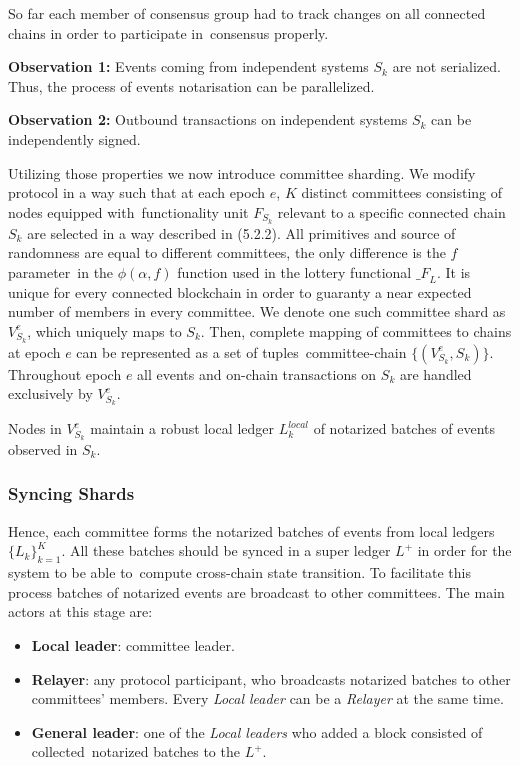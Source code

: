 So far each member of consensus group had to track changes on all connected chains in order to participate in\
consensus properly.

\textbf{Observation 1:} Events coming from independent systems $S_k$ are not serialized.
Thus, the process of events notarisation can be parallelized.

\textbf{Observation 2:} Outbound transactions on independent systems $S_k$ can be independently signed.

Utilizing those properties we now introduce committee sharding.
We modify protocol in a way such that at each epoch $e$, $K$ distinct committees consisting of nodes equipped with\
functionality unit $F_{S_k}$ relevant to a specific connected chain $S_k$ are selected in a way described in (5.2.2).
All primitives and source of randomness are equal to different committees, the only difference is the $f$ parameter\
in the $\phi(\alpha, f)$ function used in the lottery functional ${\mathcal_{F}}_{L}$.
It is unique for every connected blockchain in order to guaranty a near expected number of members in every committee.
We denote one such committee shard as $V^{e}_{S_k}$, which uniquely maps to $S_k$.
Then, complete mapping of committees to chains at epoch $e$ can be represented as a set of tuples\
committee-chain $\{(V^{e}_{S_k}, S_k)\}$.
Throughout epoch $e$ all events and on-chain transactions on $S_k$ are handled exclusively by $V^{e}_{S_k}$.

Nodes in $V^{e}_{S_k}$ maintain a robust local ledger $L^{local}_k$ of notarized batches of events observed in $S_k$.

\subsubsection{Syncing Shards}

Hence, each committee forms the notarized batches of events from local ledgers $\{L_k\}_{k=1}^{K}$.
All these batches should be synced in a super ledger $L^+$ in order for the system to be able to\
compute cross-chain state transition.
To facilitate this process batches of notarized events are broadcast to other committees.
The main actors at this stage are:
\begin{itemize}
    \item \textbf{Local leader}: committee leader.
    \item \textbf{Relayer}: any protocol participant, who broadcasts notarized batches to other committees' members.
    Every \emph{Local leader} can be a \emph{Relayer} at the same time.
    \item \textbf{General leader}: one of the \emph{Local leaders} who added a block consisted of collected\
    notarized batches to the $L^+$.
\end{itemize}

